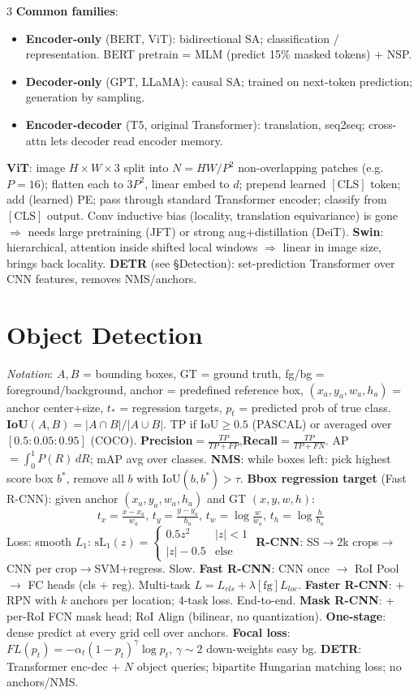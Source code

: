 \documentclass[a4paper,9pt,landscape]{scrartcl}
\begin{document}
\begin{multicols*}{3}
\textbf{Common families}:
\begin{itemize}
\item \textbf{Encoder-only} (BERT, ViT): bidirectional SA; classification / representation. BERT pretrain = MLM (predict 15\% masked tokens) + NSP.
\item \textbf{Decoder-only} (GPT, LLaMA): causal SA; trained on next-token prediction; generation by sampling.
\item \textbf{Encoder-decoder} (T5, original Transformer): translation, seq2seq; cross-attn lets decoder read encoder memory.
\end{itemize}

\textbf{ViT}: image $H\!\times\!W\!\times\!3$ split into $N{=}HW/P^2$ non-overlapping patches (e.g. $P{=}16$); flatten each to $3P^2$, linear embed to $d$; prepend learned $[\text{CLS}]$ token; add (learned) PE; pass through standard Transformer encoder; classify from $[\text{CLS}]$ output. Conv inductive bias (locality, translation equivariance) is gone $\Rightarrow$ needs large pretraining (JFT) or strong aug+distillation (DeiT).
\textbf{Swin}: hierarchical, attention inside shifted local windows $\Rightarrow$ linear in image size, brings back locality.
\textbf{DETR} (see \S Detection): set-prediction Transformer over CNN features, removes NMS/anchors.

\section{Object Detection}
\textit{Notation}: $A,B$ = bounding boxes, GT = ground truth, fg/bg = foreground/background, anchor = predefined reference box, $(x_a,y_a,w_a,h_a)$ = anchor center+size, $t_*$ = regression targets, $p_t$ = predicted prob of true class.
\textbf{IoU}$(A,B)=|A\cap B|/|A\cup B|$. TP if IoU$\ge 0.5$ (PASCAL) or averaged over $[0.5\!:\!0.05\!:\!0.95]$ (COCO).
\textbf{Precision}$=\frac{TP}{TP+FP}$,\;\textbf{Recall}$=\frac{TP}{TP+FN}$. AP $=\int_0^1 P(R)\,dR$;\; mAP avg over classes.
\textbf{NMS}: while boxes left: pick highest score box $b^*$, remove all $b$ with IoU$(b,b^*)>\tau$.
\textbf{Bbox regression target} (Fast R-CNN): given anchor $(x_a,y_a,w_a,h_a)$ and GT $(x,y,w,h)$:
$$t_x{=}\tfrac{x-x_a}{w_a},\,t_y{=}\tfrac{y-y_a}{h_a},\,t_w{=}\log\tfrac{w}{w_a},\,t_h{=}\log\tfrac{h}{h_a}$$
Loss: smooth $L_1$: $\mathrm{sL}_1(z)=\begin{cases}0.5z^2&|z|<1\\|z|-0.5&\text{else}\end{cases}$
\textbf{R-CNN}: SS$\to$2k crops$\to$CNN per crop$\to$SVM+regress. Slow.
\textbf{Fast R-CNN}: CNN once $\to$ RoI Pool $\to$ FC heads (cls + reg). Multi-task $L=L_{cls}+\lambda[\text{fg}]L_{loc}$.
\textbf{Faster R-CNN}: + RPN with $k$ anchors per location; 4-task loss. End-to-end.
\textbf{Mask R-CNN}: + per-RoI FCN mask head; RoI Align (bilinear, no quantization).
\textbf{One-stage}: dense predict at every grid cell over anchors.
\textbf{Focal loss}: $FL(p_t)=-\alpha_t(1-p_t)^\gamma\log p_t$, $\gamma{\sim}2$ down-weights easy bg.
\textbf{DETR}: Transformer enc-dec + $N$ object queries; bipartite Hungarian matching loss; no anchors/NMS.


\end{multicols*}
\end{document}
